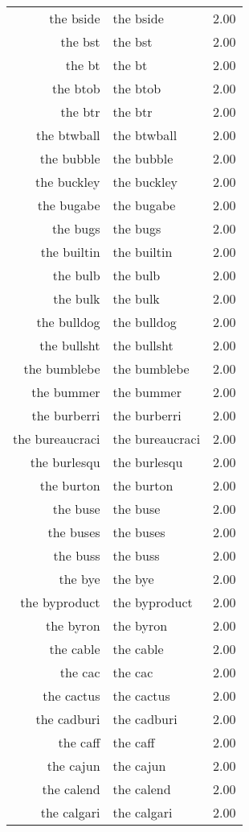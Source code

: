 \begin{table}[ht]
\begin{tabular}{rlr}
  the bside & the bside & 2.00 \\ 
  the bst & the bst & 2.00 \\ 
  the bt & the bt & 2.00 \\ 
  the btob & the btob & 2.00 \\ 
  the btr & the btr & 2.00 \\ 
  the btwball & the btwball & 2.00 \\ 
  the bubble & the bubble & 2.00 \\ 
  the buckley & the buckley & 2.00 \\ 
  the bugabe & the bugabe & 2.00 \\ 
  the bugs & the bugs & 2.00 \\ 
  the builtin & the builtin & 2.00 \\ 
  the bulb & the bulb & 2.00 \\ 
  the bulk & the bulk & 2.00 \\ 
  the bulldog & the bulldog & 2.00 \\ 
  the bullsht & the bullsht & 2.00 \\ 
  the bumblebe & the bumblebe & 2.00 \\ 
  the bummer & the bummer & 2.00 \\ 
  the burberri & the burberri & 2.00 \\ 
  the bureaucraci & the bureaucraci & 2.00 \\ 
  the burlesqu & the burlesqu & 2.00 \\ 
  the burton & the burton & 2.00 \\ 
  the buse & the buse & 2.00 \\ 
  the buses & the buses & 2.00 \\ 
  the buss & the buss & 2.00 \\ 
  the bye & the bye & 2.00 \\ 
  the byproduct & the byproduct & 2.00 \\ 
  the byron & the byron & 2.00 \\ 
  the cable & the cable & 2.00 \\ 
  the cac & the cac & 2.00 \\ 
  the cactus & the cactus & 2.00 \\ 
  the cadburi & the cadburi & 2.00 \\ 
  the caff & the caff & 2.00 \\ 
  the cajun & the cajun & 2.00 \\ 
  the calend & the calend & 2.00 \\ 
  the calgari & the calgari & 2.00 \\ 

\end{tabular}
\end{table}
